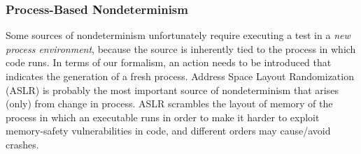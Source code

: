 \subsubsection{Process-Based Nondeterminism}

\label{sec:pnondet}

Some sources of nondeterminism unfortunately require executing a test in a \emph{new
process environment}, because the source is inherently tied to the
process in which code runs.  In terms of our formalism, an
action needs to be introduced that indicates the generation of a fresh
process.  Address Space Layout Randomization (ASLR) \cite{ASLR}  is probably the most
important source of nondeterminism that arises (only) from change in
process.  ASLR scrambles the layout of memory of the process in which
an executable runs in order to make it harder to exploit memory-safety
vulnerabilities in code, and different orders may cause/avoid crashes.

